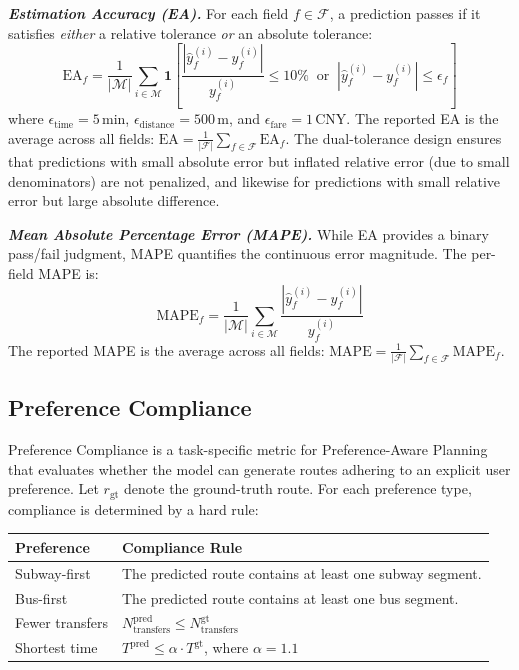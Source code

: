 \documentclass{llmxive}
\begin{document}
\textbf{\textit{Estimation Accuracy (EA).}}
For each field $f \in \mathcal{F}$, a prediction passes if it satisfies \textit{either} a relative tolerance \textit{or} an absolute tolerance:
\begin{equation}
\text{EA}_f = \frac{1}{|\mathcal{M}|}\sum_{i \in \mathcal{M}} \mathbf{1}\!\left[\frac{|\hat{y}_f^{(i)} - y_f^{(i)}|}{y_f^{(i)}} \leq 10\% \;\;\text{or}\;\; |\hat{y}_f^{(i)} - y_f^{(i)}| \leq \epsilon_f\right]
\end{equation}
where $\epsilon_{\text{time}} = 5\,\text{min}$, $\epsilon_{\text{distance}} = 500\,\text{m}$, and $\epsilon_{\text{fare}} = 1\,\text{CNY}$. The reported EA is the average across all fields: $\text{EA} = \frac{1}{|\mathcal{F}|}\sum_{f \in \mathcal{F}} \text{EA}_f$. The dual-tolerance design ensures that predictions with small absolute error but inflated relative error (due to small denominators) are not penalized, and likewise for predictions with small relative error but large absolute difference.

\textbf{\textit{Mean Absolute Percentage Error (MAPE).}} While EA provides a binary pass/fail judgment, MAPE quantifies the continuous error magnitude. The per-field MAPE is:
\begin{equation}
\text{MAPE}_f = \frac{1}{|\mathcal{M}|}\sum_{i \in \mathcal{M}} \frac{|\hat{y}_f^{(i)} - y_f^{(i)}|}{y_f^{(i)}}
\end{equation}
The reported MAPE is the average across all fields: $\text{MAPE} = \frac{1}{|\mathcal{F}|}\sum_{f \in \mathcal{F}} \text{MAPE}_f$.

\subsection{Preference Compliance}

Preference Compliance is a task-specific metric for Preference-Aware Planning that evaluates whether the model can generate routes adhering to an explicit user preference. Let $r_{\text{gt}}$ denote the ground-truth route. For each preference type, compliance is determined by a hard rule:

\begin{center}
\small
\begin{tabular}{lp{8cm}}
\toprule
\textbf{Preference} & \textbf{Compliance Rule} \\
\midrule
Subway-first & The predicted route contains at least one subway segment. \\
Bus-first & The predicted route contains at least one bus segment. \\
Fewer transfers & $N_{\text{transfers}}^{\text{pred}} \leq N_{\text{transfers}}^{\text{gt}}$ \\
Shortest time & $T^{\text{pred}} \leq \alpha \cdot T^{\text{gt}}$, where $\alpha = 1.1$ \\
\bottomrule
\end{tabular}
\end{center}
\end{document}
